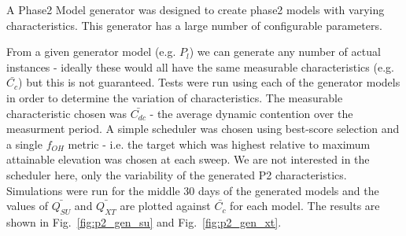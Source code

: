 \documentclass[12pt,a4paper]{article}
\begin{document}
{A Phase2 Model generator was designed to create phase2 models with varying characteristics. This generator has a large number of configurable parameters. 


From a given generator model (e.g. $P_l$) we can generate any number of actual instances - ideally these would all have the same measurable characteristics (e.g. $\bar{C_c}$) but this is not guaranteed. Tests were run using each of the generator models in order to determine the variation of characteristics. The measurable characteristic chosen was $\bar{C_{dc}}$ - the average dynamic contention over the measurment period. A simple scheduler was chosen using best-score selection and a single $f_{OH}$ metric - i.e. the target which was highest relative to maximum attainable elevation was chosen at each sweep. We are not interested in the scheduler here, only the variability of the generated  P2 characteristics. Simulations were run for the middle 30 days of the generated models and the values of $\bar{Q_{SU}}$ and $\bar{Q_{XT}}$ are plotted against $\bar{C_c}$ for each model. The results are shown in Fig.~\ref{fig:p2_gen_su} and  Fig.~\ref{fig:p2_gen_xt}.

}
\end{document}
